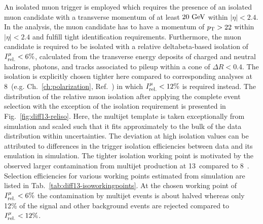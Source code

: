 An isolated muon trigger is employed which requires the presence of an isolated muon candidate with a transverse momentum of at least $20~\textrm{GeV}$ within $|\eta|<2.4$. In the analysis, the muon candidate has to have a momentum of $p_\textrm{T}>22$ within $|\eta|<2.4$ and fulfill tight identification requirements. Furthermore, the muon candidate is required to be isolated with a relative \gls{deltabeta}-based isolation of $I_\textrm{rel.}^{\mu}<6\%$, calculated from the transverse energy deposits of charged and neutral hadrons, photons, and tracks associated to pileup within a cone of $\Delta R<0.4$. The isolation is explicitly chosen tighter here compared to corresponding analyses at 8~\TeV (e.g. Ch.~\ref{ch:polarization}, Ref.~\cite{Khachatryan:2014iya}) in which $I_\textrm{rel.}^{\mu}<12\%$ is required instead. The distribution of the relative muon isolation after applying the complete event selection with the exception of the isolation requirement is presented in Fig.~\ref{fig:diff13-reliso}. Here, the multijet template is taken exceptionally from simulation and scaled such that it fits approximately to the bulk of the data distribution within uncertainties. The deviation at high isolation values can be attributed to differences in the trigger isolation efficiencies between data and its emulation in simulation. The tighter isolation working point is motivated by the observed larger contamination from multijet production at 13~\TeV compared to 8~\TeV. Selection efficiencies for various working points estimated from simulation are listed in Tab.~\ref{tab:diff13-isoworkingpoints}. At the chosen working point of $I_\textrm{rel.}^{\mu}<6\%$ the contamination by multijet events is about halved whereas only 12\% of the signal and other background events are rejected compared to $I_\textrm{rel.}^{\mu}<12\%$.



